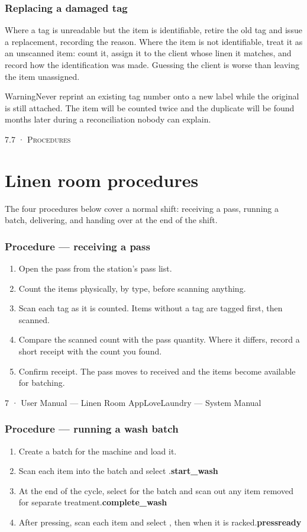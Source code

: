\documentclass[11pt,a4paper,oneside]{book}
\begin{document}
\subsubsection*{Replacing a damaged tag}
Where a tag is unreadable but the item is identifiable, retire the old tag and issue a replacement, recording the reason. Where the item is not identifiable, treat it as an unscanned item: count it, assign it to the client whose linen it matches, and record how the identification was made. Guessing the client is worse than leaving the item unassigned.

\begin{notebox}WarningNever reprint an existing tag number onto a new label while the original is still attached. The item will be counted twice and the duplicate will be found months later during a reconciliation nobody can explain.\end{notebox}
\textsc{\small\color{crimson}7.7 · Procedures}\par\medskip
\section*{Linen room procedures}
The four procedures below cover a normal shift: receiving a pass, running a batch, delivering, and handing over at the end of the shift.

\subsubsection*{Procedure — receiving a pass}
\begin{enumerate}
\item Open the pass from the station's pass list.
\item Count the items physically, by type, before scanning anything.
\item Scan each tag as it is counted. Items without a tag are tagged first, then scanned.
\item Compare the scanned count with the pass quantity. Where it differs, record a short receipt with the count you found.
\item Confirm receipt. The pass moves to received and the items become available for batching.
\end{enumerate}
7 · User Manual — Linen Room AppLoveLaundry — System Manual

\subsubsection*{Procedure — running a wash batch}
\begin{enumerate}
\item Create a batch for the machine and load it.
\item Scan each item into the batch and select .\textbf{start\_wash}
\item At the end of the cycle, select  for the batch and scan out any item removed for separate treatment.\textbf{complete\_wash}
\item After pressing, scan each item and select , then  when it is racked.\textbf{press}\textbf{ready}
\end{enumerate}
\end{document}
